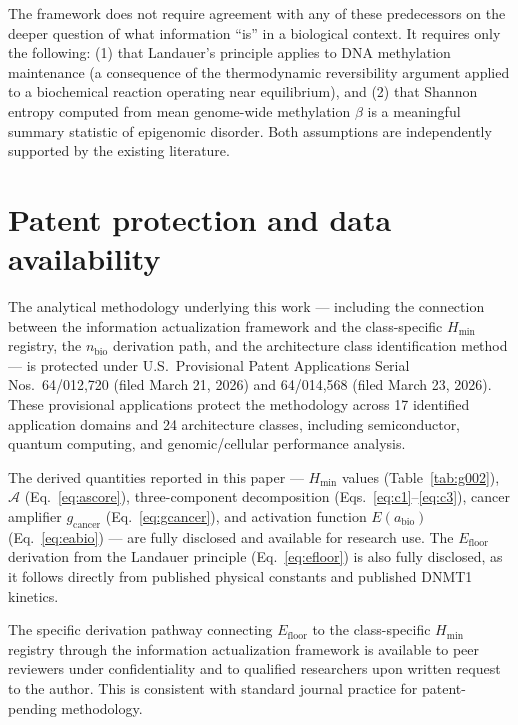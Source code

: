 \documentclass[12pt,a4paper]{article}
\newcommand{\Hmin}{H_{\min}}
\newcommand{\nbio}{n_{\mathrm{bio}}}
\newcommand{\Ascore}{\mathcal{A}}
\newcommand{\Efloor}{E_{\mathrm{floor}}}
\newcommand{\gcancer}{g_{\mathrm{cancer}}}
\newcommand{\Eabio}{E(a_{\mathrm{bio}})}
\begin{document}
The framework does not require agreement with any of these predecessors on
the deeper question of what information ``is'' in a biological context. It
requires only the following: (1) that Landauer's principle applies to
DNA methylation maintenance (a consequence of the thermodynamic reversibility
argument applied to a biochemical reaction operating near equilibrium),
and (2) that Shannon entropy computed from mean genome-wide methylation
$\beta$ is a meaningful summary statistic of epigenomic disorder. Both
assumptions are independently supported by the existing literature.

\section{Patent protection and data availability}
\label{sec:patent}

The analytical methodology underlying this work --- including the connection
between the information actualization framework and the class-specific $\Hmin$
registry, the $\nbio$ derivation path, and the architecture class identification
method --- is protected under U.S.\ Provisional Patent Applications Serial
Nos.\ 64/012,720 (filed March 21, 2026) and 64/014,568 (filed March 23, 2026).
These provisional applications protect the methodology across 17 identified
application domains and 24 architecture classes, including semiconductor,
quantum computing, and genomic/cellular performance analysis.

The derived quantities reported in this paper --- $\Hmin$ values (Table~\ref{tab:g002}),
$\Ascore$ (Eq.~\ref{eq:ascore}), three-component decomposition (Eqs.~\ref{eq:c1}--\ref{eq:c3}),
cancer amplifier $\gcancer$ (Eq.~\ref{eq:gcancer}), and activation function
$\Eabio$ (Eq.~\ref{eq:eabio}) --- are fully disclosed and available for
research use. The $\Efloor$ derivation from the Landauer principle
(Eq.~\ref{eq:efloor}) is also fully disclosed, as it follows directly
from published physical constants and published DNMT1 kinetics.

The specific derivation pathway connecting $\Efloor$ to the class-specific
$\Hmin$ registry through the information actualization framework is available
to peer reviewers under confidentiality and to qualified researchers upon
written request to the author. This is consistent with standard journal
practice for patent-pending methodology.
\end{document}
